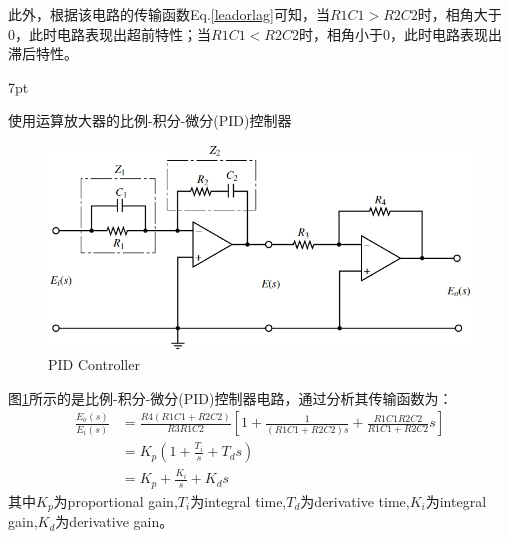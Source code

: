 \documentclass{article}
\numberwithin{equation}{section}
\numberwithin{figure}{section}
\newenvironment{formal}{%
\def\FrameCommand{%
\hspace{1pt}%
{\color{DarkBlue}\vrule width 2pt}%
{\color{formalshade}\vrule width 4pt}%
\colorbox{formalshade}%
}%
\MakeFramed{\advance\hsize-\width\FrameRestore}%
\noindent\hspace{-4.55pt}%
\begin{adjustwidth}{}{7pt}%
\vspace{2pt}\vspace{2pt}%
}
{%
\vspace{2pt}\end{adjustwidth}\endMakeFramed%
}
\begin{document}
此外，根据该电路的传输函数Eq.\ref{leadorlag}可知，当$R1C1>R2C2$时，相角大于0，此时电路表现出超前特性；当$R1C1<R2C2$时，相角小于0，此时电路表现出滞后特性。

\begin{formal}
    使用运算放大器的比例-积分-微分(PID)控制器
\end{formal}

\begin{figure}
    \centering
    \includegraphics[width=.7\textwidth]{Chapter3/PIDController.png} %
    \caption{PID Controller} %
    \label{PID Controller} %
\end{figure}

图\ref{PID Controller}所示的是比例-积分-微分(PID)控制器电路，通过分析其传输函数为：
\begin{equation}
    \begin{split}
        \frac{E_o(s)}{E_i(s)}&=\frac{R4(R1C1+R2C2)}{R3R1C2}[1+\frac{1}{(R1C1+R2C2)s}+\frac{R1C1R2C2}{R1C1+R2C2}s]\\
        &=K_p(1+\frac{T_i}{s}+T_ds)\\
        &=K_p+\frac{K_i}{s}+K_ds
    \end{split}
\end{equation}
其中$K_p$为proportional gain,$T_i$为integral time,$T_d$为derivative time,$K_i$为integral gain,$K_d$为derivative gain。
\end{document}
